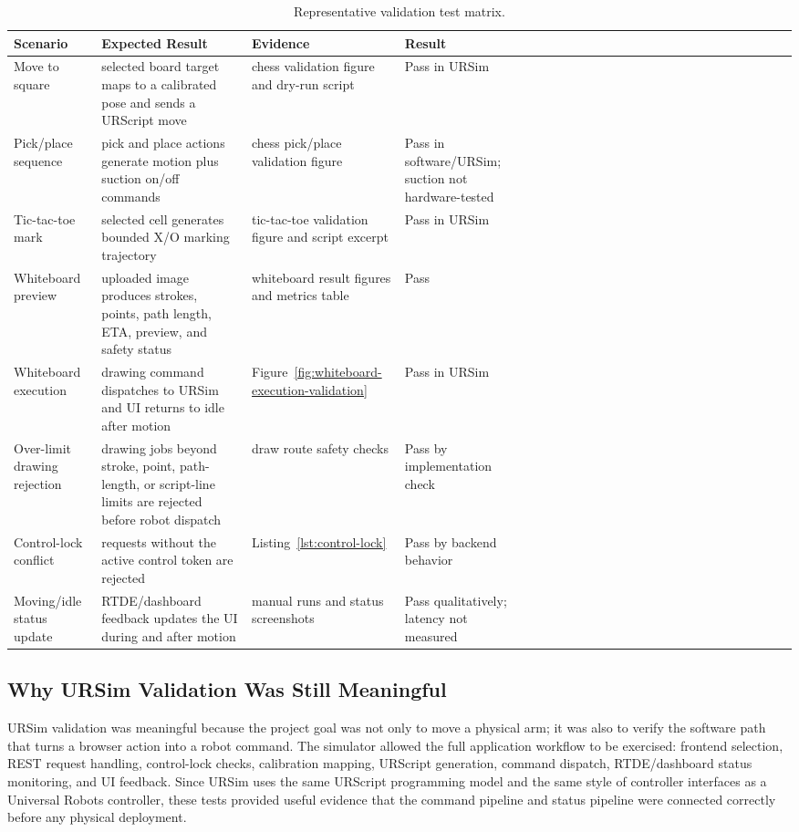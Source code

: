 \documentclass[12pt]{article}
\newcommand{\tablegridon}{\arrayrulecolor{black!35}}
\newcommand{\tablegridoff}{\arrayrulecolor{black}}
\newcommand{\tabrowsep}{\\[0.12em]\hline}
\begin{document}
\begin{table}[H]
\centering
\caption{Representative validation test matrix.}
\label{tab:representative-test-matrix}
\small
\tablegridon
\begin{tabularx}{\textwidth}{|L{3.3cm}|Y|L{3.0cm}|L{2.4cm}|}
\toprule
Scenario & Expected Result & Evidence & Result \\
\midrule
Move to square & selected board target maps to a calibrated pose and sends a URScript move & chess validation figure and dry-run script & Pass in URSim \tabrowsep
Pick/place sequence & pick and place actions generate motion plus suction on/off commands & chess pick/place validation figure & Pass in software/URSim; suction not hardware-tested \tabrowsep
Tic-tac-toe mark & selected cell generates bounded X/O marking trajectory & tic-tac-toe validation figure and script excerpt & Pass in URSim \tabrowsep
Whiteboard preview & uploaded image produces strokes, points, path length, ETA, preview, and safety status & whiteboard result figures and metrics table & Pass \tabrowsep
Whiteboard execution & drawing command dispatches to URSim and UI returns to idle after motion & Figure~\ref{fig:whiteboard-execution-validation} & Pass in URSim \tabrowsep
Over-limit drawing rejection & drawing jobs beyond stroke, point, path-length, or script-line limits are rejected before robot dispatch & draw route safety checks & Pass by implementation check \tabrowsep
Control-lock conflict & requests without the active control token are rejected & Listing~\ref{lst:control-lock} & Pass by backend behavior \tabrowsep
Moving/idle status update & RTDE/dashboard feedback updates the UI during and after motion & manual runs and status screenshots & Pass qualitatively; latency not measured \\
\bottomrule
\end{tabularx}
\tablegridoff
\end{table}

\vspace{0.5 em}

\subsection{Why URSim Validation Was Still Meaningful}
URSim validation was meaningful because the project goal was not only to move a physical arm; it was also to verify the software path that turns a browser action into a robot command. The simulator allowed the full application workflow to be exercised: frontend selection, REST request handling, control-lock checks, calibration mapping, URScript generation, command dispatch, RTDE/dashboard status monitoring, and UI feedback. Since URSim uses the same URScript programming model and the same style of controller interfaces as a Universal Robots controller, these tests provided useful evidence that the command pipeline and status pipeline were connected correctly before any physical deployment.
\end{document}
